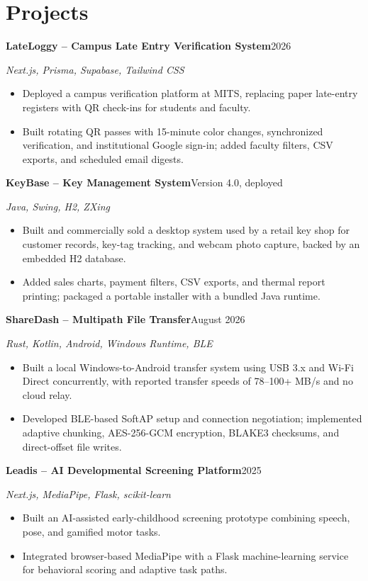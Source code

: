 \documentclass[a4paper,10pt]{article}
\newcommand{\project}[3]{%
  \noindent\textbf{#1}\hfill{\small #2}\par
  {\small\emph{#3}}\par\vspace{-2pt}%
}
\begin{document}
\section{Projects}
\project{LateLoggy -- Campus Late Entry Verification System}{2026}{Next.js, Prisma, Supabase, Tailwind CSS}
\begin{itemize}
  \item Deployed a campus verification platform at MITS, replacing paper late-entry registers with QR check-ins for students and faculty.
  \item Built rotating QR passes with 15-minute color changes, synchronized verification, and institutional Google sign-in; added faculty filters, CSV exports, and scheduled email digests.
\end{itemize}

\project{KeyBase -- Key Management System}{Version 4.0, deployed}{Java, Swing, H2, ZXing}
\begin{itemize}
  \item Built and commercially sold a desktop system used by a retail key shop for customer records, key-tag tracking, and webcam photo capture, backed by an embedded H2 database.
  \item Added sales charts, payment filters, CSV exports, and thermal report printing; packaged a portable installer with a bundled Java runtime.
\end{itemize}

\project{ShareDash -- Multipath File Transfer}{August 2026}{Rust, Kotlin, Android, Windows Runtime, BLE}
\begin{itemize}
  \item Built a local Windows-to-Android transfer system using USB 3.x and Wi-Fi Direct concurrently, with reported transfer speeds of 78--100+ MB/s and no cloud relay.
  \item Developed BLE-based SoftAP setup and connection negotiation; implemented adaptive chunking, AES-256-GCM encryption, BLAKE3 checksums, and direct-offset file writes.
\end{itemize}

\project{Leadis -- AI Developmental Screening Platform}{2025}{Next.js, MediaPipe, Flask, scikit-learn}
\begin{itemize}
  \item Built an AI-assisted early-childhood screening prototype combining speech, pose, and gamified motor tasks.
  \item Integrated browser-based MediaPipe with a Flask machine-learning service for behavioral scoring and adaptive task paths.
\end{itemize}
\end{document}
